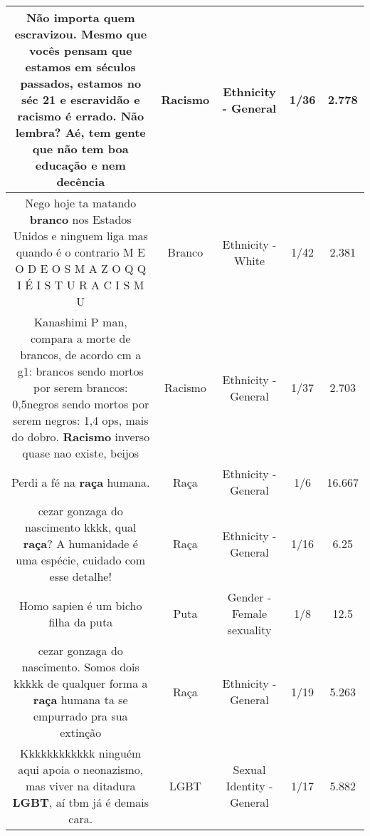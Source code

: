 \documentclass[11pt]{article}
\newlength\mylength
\begin{document}
\begin{center}
\begin{longtable}{|C{.65\mylength}|C{.30\mylength}|C{.12\mylength}|C{.12\mylength}|C{.12\mylength}|}
  \small Não importa quem escravizou. Mesmo que vocês pensam que estamos em séculos passados, estamos no séc 21 e escravidão e \textbf{racismo} é errado. Não lembra? Aé, tem gente que não tem boa educação e nem decência\normalsize   & Racismo & Ethnicity - General & 1/36 & 2.778 \\  \hline
  \small Nego hoje ta matando \textbf{branco} nos Estados Unidos e ninguem liga mas quando é o contrario M E O   D E O S   M A Z O Q   Q I    É    I S T U   R A C I S M U\normalsize   & Branco & Ethnicity - White & 1/42 & 2.381 \\  \hline
  \small Kanashimi P man, compara a morte de brancos, de acordo cm a g1: brancos sendo mortos por serem brancos: 0,5negros sendo mortos por serem negros: 1,4 ops, mais do dobro. \textbf{Racismo} inverso quase nao existe, beijos\normalsize   & Racismo & Ethnicity - General & 1/37 & 2.703 \\  \hline
  \small Perdi a fé na \textbf{raça} humana.\normalsize   & Raça & Ethnicity - General & 1/6 & 16.667 \\  \hline
  \small cezar gonzaga do nascimento kkkk, qual \textbf{raça}? A humanidade é uma espécie, cuidado com esse detalhe!\normalsize   & Raça & Ethnicity - General & 1/16 & 6.25 \\  \hline
  \small Homo sapien é um bicho filha da puta\normalsize   & Puta & Gender - Female sexuality & 1/8 & 12.5 \\  \hline
  \small cezar gonzaga do nascimento. Somos dois kkkkk de qualquer forma a \textbf{raça} humana ta se empurrado pra sua extinção\normalsize   & Raça & Ethnicity - General & 1/19 & 5.263 \\  \hline
  \small Kkkkkkkkkkkk ninguém aqui apoia o neonazismo, mas viver na ditadura \textbf{LGBT}, aí tbm já é demais cara.\normalsize   & LGBT & Sexual Identity - General & 1/17 & 5.882 \\  \hline

\end{longtable}
\end{center}
\end{document}
